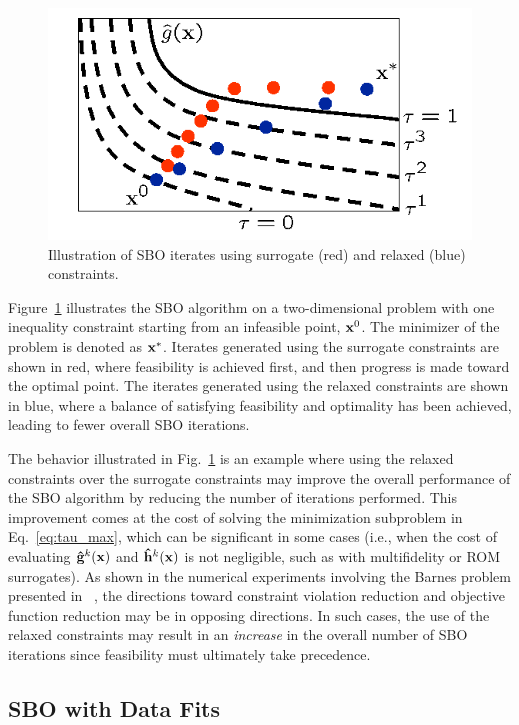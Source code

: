 \begin{figure}
  \centering
  \includegraphics[width=.35\textwidth]{images/tau_updates}
  \caption{Illustration of SBO iterates using surrogate (red) and
  relaxed (blue) constraints.}
  \label{fig:constr_relax}
\end{figure}
Figure~\ref{fig:constr_relax} illustrates the SBO algorithm on a
two-dimensional problem with one inequality constraint starting from
an infeasible point, ${\bf x}^0$.  The minimizer of the problem is
denoted as ${\bf x}^*$.  Iterates generated using the surrogate
constraints are shown in red, where feasibility is achieved first, and
then progress is made toward the optimal point.  The iterates
generated using the relaxed constraints are shown in blue, where a
balance of satisfying feasibility and optimality has been achieved,
leading to fewer overall SBO iterations.

The behavior illustrated in Fig.~\ref{fig:constr_relax} is an example
where using the relaxed constraints over the surrogate constraints may
improve the overall performance of the SBO algorithm by reducing the
number of iterations performed.  This improvement comes at the cost of
solving the minimization subproblem in Eq.~\ref{eq:tau_max}, which can
be significant in some cases (i.e., when the cost of evaluating 
${\bf {\hat g}}^k({\bf x})$ and ${\bf {\hat h}}^k({\bf x})$ is not
negligible, such as with multifidelity or ROM surrogates).  As shown
in the numerical experiments involving the Barnes problem presented 
in ~\cite{Per04a}, 
the directions toward constraint violation
reduction and objective function reduction may be in opposing
directions.  In such cases, the use of the relaxed constraints may
result in an {\em increase} in the overall number of SBO iterations
since feasibility must ultimately take precedence.

\subsection{SBO with Data Fits}\label{sbm:sblm:surface}

